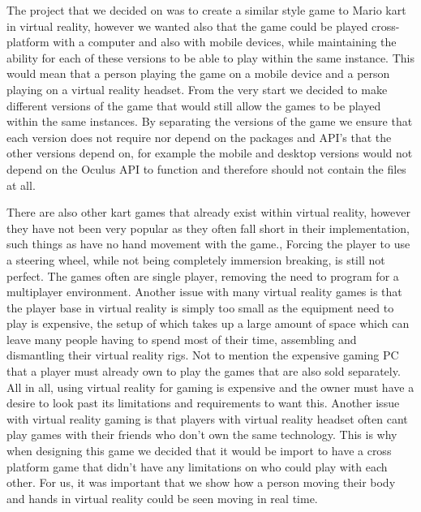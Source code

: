 The project that we decided on was to create a similar style game to Mario kart in virtual reality, however we wanted also that the game could be played cross-platform with a computer and also with mobile devices, while maintaining the ability for each of these versions to be able to play within the same instance. This would mean that a person playing the game on a mobile device and a person playing on a virtual reality headset. From the very start we decided to make different versions of the game that would still allow the games to be played within the same instances. By separating the versions of the game we ensure that each version does not require nor depend on the packages and API's that the other versions depend on, for example the mobile and desktop versions would not depend on the Oculus API to function and therefore should not contain the files at all. \newline

There are also other kart games that already exist within virtual reality, however they have not been very popular as they often fall short in their implementation, such things as have no hand movement with the game., Forcing the player to use a steering wheel, while not being completely immersion breaking, is still not perfect. The games often are single player, removing the need to program for a multiplayer environment. Another issue with many virtual reality games is that the player base in virtual reality is simply too small as the equipment need to play is expensive, the setup of which takes up a large amount of space which can leave many people having to spend most of their time, assembling and dismantling their virtual reality rigs. Not to mention the expensive gaming PC that a player must already own to play the games that are also sold separately. All in all, using virtual reality for gaming is expensive and the owner must have a desire to look past its limitations and requirements to want this. Another issue with virtual reality gaming is that players with virtual reality headset often cant play games with their friends who don't own the same technology. This is why when designing this game we decided that it would be import to have a cross platform game that didn't have any limitations on who could play with each other. For us, it was important that we show how a person moving their body and hands in virtual reality could be seen moving in real time.
\newline

